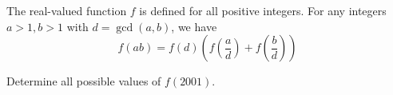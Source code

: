 The real-valued function $f$ is defined for all positive integers. For any integers $a>1, b>1$ with $d=\gcd (a, b)$,  we have\[f(ab)=f(d)\left(f\left(\frac{a}{d}\right)+f\left(\frac{b}{d}\right)\right) \]

Determine all possible values of $f(2001)$.